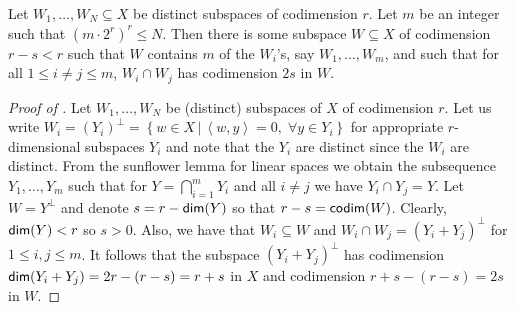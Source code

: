 \documentclass{toc}
\newcommand\Set[2]{ \left\{ #1 \,  \vert  \, #2\right\} }
\newcommand*\dimm{{\sf dim}}
\newcommand*\codimm{{\sf codim}}
\renewcommand\leq{\leqslant}
\renewcommand\le{\leqslant}
\renewcommand\subset{\subseteq}
\begin{document}
\begin{corollary}\label{cor:sunflower}
  Let $W_1,\ldots,W_N\subset X$ be distinct subspaces of codimension
  $r$. Let $m$ be an integer such that $(m \cdot 2^r)^r \leq N$. Then
  there is some subspace $W\subset X$ of codimension
  $r-s<r$
  such
  that $W$ contains $m$ of the $W_i$'s, say $W_1,\ldots,W_m$, and such
  that for all $1\le i\neq j \le m$, $W_i\cap W_j$ has codimension
  $2s$ in $W$.
\end{corollary}
\begin{proof}[Proof of ]
Let $W_1, \ldots, W_N$ be (distinct) subspaces of $X$ of codimension $r$. Let us write $W_i = (Y_i)^\perp = \Set{ w \in X }{ \left<w,y\right>=0,\; \forall y\in Y_i}$ for appropriate $r$-dimensional subspaces $Y_i$ and note that the $Y_i$ are distinct since the $W_i$ are distinct.
From the sunflower lemma for linear spaces we obtain the subsequence $Y_1,\dots,Y_m$ such that for
%
$Y=\bigcap_{i=1}^{m} Y_i$
and all $i\neq j$ we have $Y_i \cap Y_j = Y$.
Let $W = Y^\perp$ and denote $s = r-\dimm(Y)$ so that $r-s=\codimm(W)$.
%
Clearly, $\dimm(Y)<r$ so $s>0$.
Also, we have that $W_i \subset W$ and $W_i\cap W_j = (Y_i+Y_j)^\perp$ for $1\leq i,j\leq m$.
It follows that the subspace $(Y_i+Y_j)^\perp$ has codimension $\dimm(Y_i+Y_j) = 2r-(r-s) = r+s$ in $X$ and codimension $r+s - (r-s) = 2s$ in $W$.
\end{proof}
%
\end{document}
